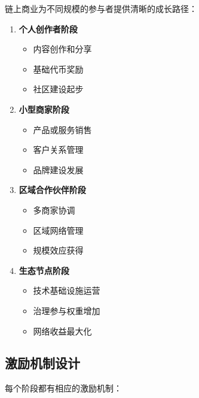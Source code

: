 \documentclass[
  Letterpaper,
]{scrbook}
\providecommand{\tightlist}{%
  \setlength{\itemsep}{0pt}\setlength{\parskip}{0pt}}
\begin{document}
链上商业为不同规模的参与者提供清晰的成长路径：

\begin{enumerate}
\def\labelenumi{\arabic{enumi}.}
\tightlist
\item
  \textbf{个人创作者阶段}

  \begin{itemize}
  \tightlist
  \item
    内容创作和分享
  \item
    基础代币奖励
  \item
    社区建设起步
  \end{itemize}
\item
  \textbf{小型商家阶段}

  \begin{itemize}
  \tightlist
  \item
    产品或服务销售
  \item
    客户关系管理
  \item
    品牌建设发展
  \end{itemize}
\item
  \textbf{区域合作伙伴阶段}

  \begin{itemize}
  \tightlist
  \item
    多商家协调
  \item
    区域网络管理
  \item
    规模效应获得
  \end{itemize}
\item
  \textbf{生态节点阶段}

  \begin{itemize}
  \tightlist
  \item
    技术基础设施运营
  \item
    治理参与权重增加
  \item
    网络收益最大化
  \end{itemize}
\end{enumerate}

\subsection{激励机制设计}\label{ux6fc0ux52b1ux673aux5236ux8bbeux8ba1}

每个阶段都有相应的激励机制：
\end{document}
